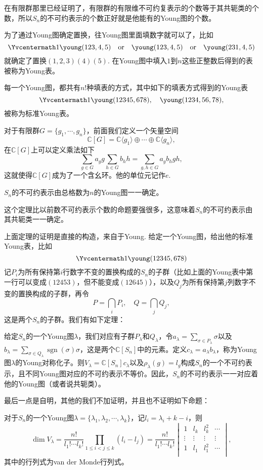 \documentclass[9pt]{extarticle}
\newcommand{\cc}{\mathbb{C}}
\DeclareMathOperator{\sgn}{sgn}
\begin{document}
在有限群那里已经证明了，有限群的有限维不可约复表示的个数等于其共轭类的个数，所以$S_n$的不可约表示的个数正好就是他能有的Young图的个数。

\para 为了通过Young图确定置换，往Young图里面填数字就可以了，比如
\[\Yvcentermath1
	\young(123,4,5)\quad \text{or}\quad \young(123,4,5)\quad \text{or}\quad \young(231,4,5)
\]
就确定了置换$(1,2,3)(4)(5)$. 在Young图中填入$1$到$n$这些正整数后得到的表被称为Young表。

每一个Young图，都共有$n!$种填表的方式，其中如下的填表方式得到的Young表
\[\Yvcentermath1
	\young(12345,678),\quad \young(1234,56,78),
\]
被称为标准Young表。

\para 对于有限群$G=\{g_1,\cdots,g_n\}$，前面我们定义一个矢量空间
\[
	\cc [G]=\cc\langle g_1\rangle \oplus \cdots \oplus \cc\langle g_n\rangle,
\]
在$\cc [G]$上可以定义乘法如下
\[
	\sum_{g\in G} a_g g \sum_{h\in G} b_h h=\sum_{g,h\in G}a_gb_h gh,
\]
这就使得$\cc [G]$成为了一个含幺环。他的单位元记作$e$.

\theo $S_n$的不可约表示由总格数为$n$的Young图一一确定。

这个定理比以前数不可约表示个数的命题要强很多，这意味着$S_n$的不可约表示由其共轭类一一确定。

\para 上面定理的证明是直接的构造，来自于Young. 给定一个Young图，给出他的标准Young表，比如
\[\Yvcentermath1
	\young(12345,678)
\]
记$P_i$为所有保持第$i$行数字不变的置换构成的$S_n$的子群（比如上面的Young表中第一行可以变成$(12453)$，但不能变成$(12645)$），以及$Q_j$为所有保持第$j$列数字不变的置换构成的子群，再令
\[
	P=\bigcap_i P_i,\quad Q=\bigcap_j Q_j,
\]
这是两个$S_n$的子群。我们有如下定理：

\theo 给定$S_n$的一个Young图$\lambda$，我们对应有子群$P_\lambda$和$Q_\lambda$，令$a_\lambda=\sum_{\sigma\in P_\lambda}\sigma$以及$b_\lambda=\sum_{\sigma\in Q_\lambda}\sgn(\sigma)\sigma$，这是两个$\cc[S_n]$中的元素。定义$c_\lambda=a_\lambda b_\lambda$，称为Young图$\lambda$的Young对称化子。则$V_\lambda=\cc[S_n]c_\lambda$以及$\rho_\lambda(g)=l_g$构成$S_n$的一个不可约表示，且不同Young图对应的不可约表示不等价。因此，$S_n$的不可约表示一一对应着他的Young图（或者说共轭类）。

最后一点是自明，其他的我们不加证明，并且也不证明如下命题：

\pro 对于$S_n$的一个Young图$\lambda=\{\lambda_1,\lambda_2,\cdots,\lambda_k\}$，记$l_i=\lambda_i+k-i$，则
\[
	\dim V_\lambda=\frac{n!}{l_1!\cdots l_k!}\prod_{1\leq i< j\leq k}(l_i-l_j)=\frac{n!}{l_1!\cdots l_k!}\begin{vmatrix}
	1& l_k & l_k^2&\cdots\\
	\vdots&\vdots&\vdots&\vdots\\
	1& l_1 & l_1^2&\cdots\\
	\end{vmatrix},
\]
其中的行列式为van der Monde行列式。
\end{document}
